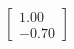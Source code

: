 \documentclass[preview]{standalone}
\begin{document}
\begin{align*}
\begin{bmatrix} 1.00 \\ -0.70 \end{bmatrix}
\end{align*}
\end{document}
